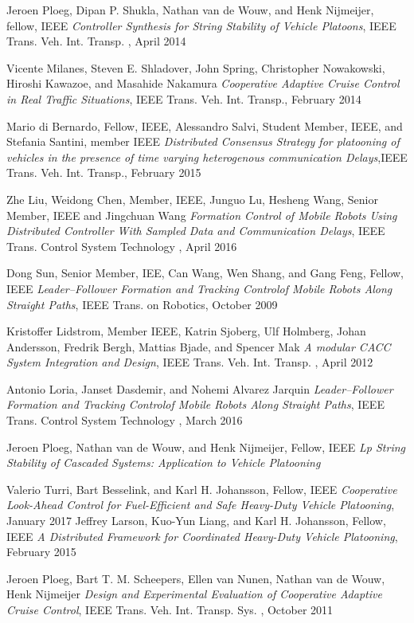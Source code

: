 \begin{thebibliography}{10}
Jeroen Ploeg, Dipan P. Shukla, Nathan van de Wouw, and Henk Nijmeijer, fellow, IEEE
\textit{Controller Synthesis for String Stability of Vehicle Platoons}, IEEE Trans. Veh. Int. Transp. , April 2014


Vicente Milanes, Steven E. Shladover, John Spring, Christopher Nowakowski, Hiroshi Kawazoe, and Masahide Nakamura
\textit{Cooperative Adaptive Cruise Control in Real Traffic Situations},  IEEE Trans. Veh. Int. Transp., February 2014

Mario di Bernardo, Fellow, IEEE, Alessandro Salvi, Student Member, IEEE, and Stefania Santini, member IEEE
\textit{Distributed Consensus Strategy for platooning of vehicles in the presence of time varying heterogenous communication Delays},IEEE Trans. Veh. Int. Transp., February 2015

Zhe Liu, Weidong Chen, Member, IEEE, Junguo Lu, Hesheng Wang, Senior Member, IEEE and Jingchuan Wang
\textit{Formation Control of Mobile Robots Using Distributed Controller With Sampled Data and Communication Delays}, IEEE Trans. Control System Technology , April 2016

Dong Sun,  Senior Member, IEE, Can Wang, Wen Shang, and Gang Feng, Fellow, IEEE
\textit{Leader–Follower Formation and Tracking Controlof Mobile Robots Along Straight Paths}, IEEE Trans. on Robotics, October 2009


Kristoffer Lidstrom, Member IEEE, Katrin Sjoberg, Ulf Holmberg, Johan Andersson, Fredrik Bergh, Mattias Bjade, and Spencer Mak
\textit{A modular CACC System Integration and Design}, IEEE Trans. Veh. Int. Transp. , April 2012

Antonio Loria, Janset Dasdemir, and Nohemi Alvarez Jarquin
\textit{Leader–Follower Formation and Tracking Controlof Mobile Robots Along Straight Paths}, IEEE Trans. Control System Technology , March 2016

Jeroen Ploeg, Nathan van de Wouw, and Henk Nijmeijer, Fellow, IEEE
\textit{Lp String Stability of Cascaded Systems: Application to Vehicle Platooning}


Valerio Turri, Bart Besselink, and Karl H. Johansson, Fellow, IEEE
\textit{Cooperative Look-Ahead Control for Fuel-Efficient
and Safe Heavy-Duty Vehicle Platooning}, January 2017
Jeffrey Larson, Kuo-Yun Liang, and Karl H. Johansson, Fellow, IEEE
\textit{A Distributed Framework for Coordinated
Heavy-Duty Vehicle Platooning}, February 2015


Jeroen Ploeg, Bart T. M. Scheepers, Ellen van Nunen, Nathan van de Wouw, Henk Nijmeijer
\textit{Design and Experimental Evaluation of Cooperative Adaptive Cruise Control}, IEEE Trans. Veh. Int. Transp. Sys. , October 2011



\end{thebibliography}